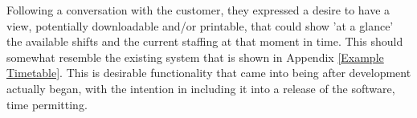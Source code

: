 Following a conversation with the customer, they expressed a desire to have a view, potentially downloadable and/or printable, that could show 'at a glance' the available shifts and the current staffing at that moment in time. This should somewhat resemble the existing system that is shown in Appendix \ref{Example Timetable}. This is desirable functionality that came into being after development actually began, with the intention in including it into a release of the software, time permitting.
